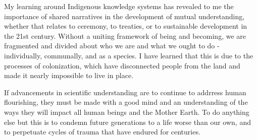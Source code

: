 \documentclass{report}
\begin{document}
\hspace{24pt} My learning around Indigenous knowledge systems has revealed to me the importance of shared narratives in the development of mutual understanding, whether that relates to ceremony, to treaties, or to sustainable development in the 21st century. Without a uniting framework of being and becoming, we are fragmented and divided about who we are and what we ought to do - individually, communally, and as a species. I have learned that this is due to the processes of colonization, which have disconnected people from the land and made it nearly impossible to live in place.

\hspace{24pt} If advancements in scientific understanding are to continue to addrress human flourishing, they must be made with a good mind and an understanding of the ways they will impact all human beings and the Mother Earth. To do anything else but this is to condemn future generations to a life worse than our own, and to perpetuate cycles of trauma that have endured for centuries.

\clearpage

\printbibliography[heading=bibintoc]
\end{document}
